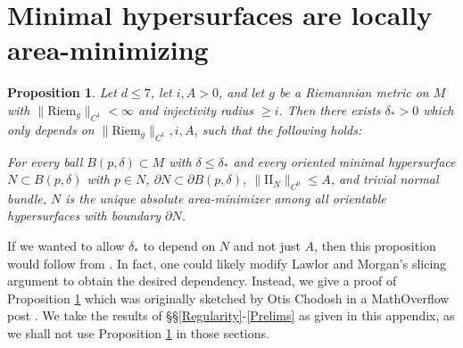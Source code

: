 \documentclass[reqno,11pt]{amsart}
\newcommand{\RR}{\mathbf{R}}
\newcommand*\dif{\mathop{}\!\mathrm{d}}
\newcommand{\Two}{\mathrm{I\!I}}
\newcommand{\Riem}{\mathrm{Riem}}
\DeclareMathOperator{\Div}{div}
\newcommand{\cpt}{\mathrm{cpt}}
\newtheorem{proposition}[theorem]{Proposition}
\theoremstyle{definition}
\numberwithin{equation}{section}
\begin{document}


\section{Minimal hypersurfaces are locally area-minimizing} \label{locally minimizing appendix}
\begin{proposition}\label{minimal implies locally minimizing}
Let $d \leq 7$, let $i, A > 0$, and let $g$ be a Riemannian metric on $M$ with $\|\Riem_g\|_{C^1} < \infty$ and injectivity radius $\geq i$.
Then there exists $\delta_* > 0$ which only depends on $\|\Riem_g\|_{C^1}, i, A$, such that the following holds:

For every ball $B(p, \delta) \subset M$ with $\delta \leq \delta_*$ and every oriented minimal hypersurface $N \subset B(p, \delta)$ with $p \in N$, $\partial N \subset \partial B(p, \delta)$, $\|\Two_N\|_{C^0} \leq A$, and trivial normal bundle, $N$ is the unique absolute area-minimizer among all orientable hypersurfaces with boundary $\partial N$.
\end{proposition}

If we wanted to allow $\delta_*$ to depend on $N$ and not just $A$, then this proposition would follow from \cite[Theorem 2.1]{Lawlor96}.
In fact, one could likely modify Lawlor and Morgan's slicing argument to obtain the desired dependency.
Instead, we give a proof of Proposition \ref{minimal implies locally minimizing} which was originally sketched by Otis Chodosh in a MathOverflow post \cite{MathOverflowMinimalLocal}.
We take the results of \S\S\ref{Regularity}-\ref{Prelims} as given in this appendix, as we shall not use Proposition \ref{minimal implies locally minimizing} in those sections.
\end{document}

